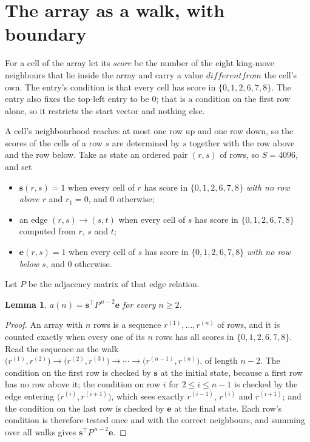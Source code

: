 \documentclass[11pt,a4paper]{article}
\theoremstyle{plain}
\newtheorem{lemma}[theorem]{Lemma}
\theoremstyle{definition}
\begin{document}
\section{The array as a walk, with boundary}

For a cell of the array let its \emph{score} be the number of the eight king-move neighbours that lie inside
the array and carry a value $different from$ the cell's own. The entry's condition is that every cell
has score in $\{0,1,2,6,7,8\}$. The entry also fixes the top-left entry to be $0$; that is a condition on the first row alone, so it restricts the start vector and nothing else.

A cell's neighbourhood reaches at most one row up and one row down, so the scores of the
cells of a row $s$ are determined by $s$ together with the row above and the row below.
Take as state an ordered pair $(r,s)$ of rows, so $S=4096$, and set
\begin{itemize}
\item $\mathbf{s}(r,s)=1$ when every cell of $r$ has score in $\{0,1,2,6,7,8\}$ \emph{with no row
above $r$} and $r_1=0$, and $0$ otherwise;
\item an edge $(r,s)\to(s,t)$ when every cell of $s$ has score in $\{0,1,2,6,7,8\}$ computed from
$r$, $s$ and $t$;
\item $\mathbf{e}(r,s)=1$ when every cell of $s$ has score in $\{0,1,2,6,7,8\}$ \emph{with no row
below $s$}, and $0$ otherwise.
\end{itemize}
Let $P$ be the adjacency matrix of that edge relation.

\begin{lemma}\label{lem:walk}
$a(n)=\mathbf{s}^{\!\top}P^{\,n-2}\mathbf{e}$ for every $n\ge2$.
\end{lemma}

\begin{proof}
An array with $n$ rows is a sequence $r^{(1)},\dots,r^{(n)}$ of rows, and it is counted
exactly when every one of its $n$ rows has all scores in $\{0,1,2,6,7,8\}$. Read the sequence as the
walk $\bigl(r^{(1)},r^{(2)}\bigr)\to\bigl(r^{(2)},r^{(3)}\bigr)\to\cdots\to
\bigl(r^{(n-1)},r^{(n)}\bigr)$, of length $n-2$. The condition on the first row is
checked by $\mathbf{s}$ at the initial state, because a first row has no row above it; the
condition on row $i$ for $2\le i\le n-1$ is checked by the edge entering
$\bigl(r^{(i)},r^{(i+1)}\bigr)$, which sees exactly $r^{(i-1)}$, $r^{(i)}$ and
$r^{(i+1)}$; and the condition on the last row is checked by $\mathbf{e}$ at the final
state. Each row's condition is therefore tested once and with the correct neighbours, and
summing over all walks gives $\mathbf{s}^{\!\top}P^{\,n-2}\mathbf{e}$.
\end{proof}
\end{document}
